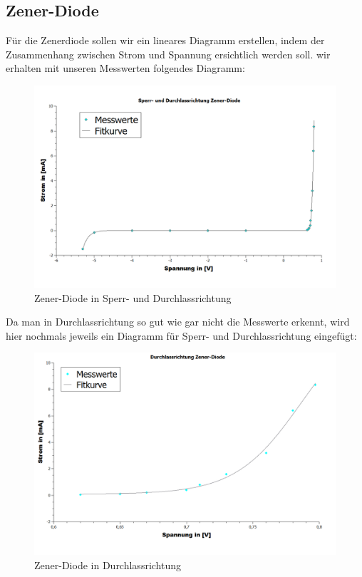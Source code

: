 \documentclass[fontsize=12pt]{scrartcl}
\begin{document}
\newpage

\subsection{Zener-Diode}

Für die Zenerdiode sollen wir ein lineares Diagramm erstellen, indem der Zusammenhang zwischen Strom und Spannung ersichtlich werden soll. wir erhalten mit unseren Messwerten folgendes Diagramm:\\
\begin{figure}[H]
\vspace{-20pt}
\centering
\includegraphics[scale=0.35]{Graphik/Zener}
\caption{Zener-Diode in Sperr- und Durchlassrichtung}
\end{figure}
\noindent
Da man in Durchlassrichtung so gut wie gar nicht die Messwerte erkennt, 
wird hier nochmals jeweils ein Diagramm für Sperr- und Durchlassrichtung eingefügt:\\
\begin{figure}[H]
\vspace{-20pt}
\centering
\includegraphics[scale=0.35]{Graphik/Zener_Durchlass}
\caption{Zener-Diode in Durchlassrichtung}
\end{figure}
\end{document}
